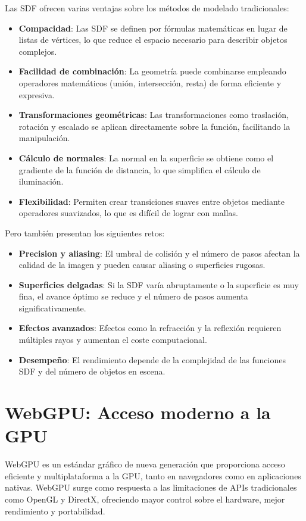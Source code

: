 Las SDF ofrecen varias ventajas sobre los métodos de modelado tradicionales:

\begin{itemize}
    \item \textbf{Compacidad}: Las SDF se definen por fórmulas matemáticas en lugar de listas de vértices, lo que reduce el espacio necesario para describir objetos complejos.
    \item \textbf{Facilidad de combinación}: La geometría puede combinarse empleando operadores matemáticos (unión, intersección, resta) de forma eficiente y expresiva.
    \item \textbf{Transformaciones geométricas}: Las transformaciones como traslación, rotación y escalado se aplican directamente sobre la función, facilitando la manipulación.
    \item \textbf{Cálculo de normales}: La normal en la superficie se obtiene como el gradiente de la función de distancia, lo que simplifica el cálculo de iluminación.
    \item \textbf{Flexibilidad}: Permiten crear transiciones suaves entre objetos mediante operadores suavizados, lo que es difícil de lograr con mallas.
\end{itemize}

Pero también presentan los siguientes retos:

\begin{itemize}
    \item \textbf{Precision y aliasing}: El umbral de colisión y el número de pasos afectan la calidad de la imagen y pueden causar aliasing o superficies rugosas.
    \item \textbf{Superficies delgadas}: Si la SDF varía abruptamente o la superficie es muy fina, el avance óptimo se reduce y el número de pasos aumenta significativamente.
    \item \textbf{Efectos avanzados}: Efectos como la refracción y la reflexión requieren múltiples rayos y aumentan el coste computacional.
    \item \textbf{Desempeño}: El rendimiento depende de la complejidad de las funciones SDF y del número de objetos en escena.
\end{itemize}

\section{WebGPU: Acceso moderno a la GPU}

WebGPU es un estándar gráfico de nueva generación que proporciona acceso
eficiente y multiplataforma a la GPU, tanto en navegadores como en aplicaciones
nativas. WebGPU surge como respuesta a las limitaciones de APIs tradicionales
como OpenGL y DirectX, ofreciendo mayor control sobre el hardware, mejor
rendimiento y portabilidad.

